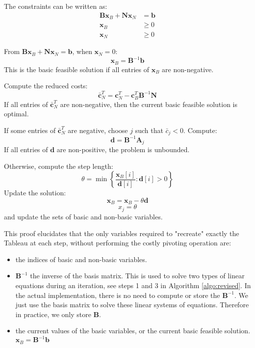 The constraints can be written as:
\begin{align*}
    \mathbf{B}\mathbf{x}_B + \mathbf{N}\mathbf{x}_N & = \mathbf{b} \\
    \mathbf{x}_B                                    & \geq 0       \\
    \mathbf{x}_N                                    & \geq 0
\end{align*}

From \( \mathbf{B}\mathbf{x}_B + \mathbf{N}\mathbf{x}_N = \mathbf{b} \), when \( \mathbf{x}_N = 0 \):
\[ \mathbf{x}_B = \mathbf{B}^{-1}\mathbf{b} \]
This is the basic feasible solution if all entries of \( \mathbf{x}_B \) are non-negative.

Compute the reduced costs:
\[ \bar{\mathbf{c}}_N^T = \mathbf{c}_N^T - \mathbf{c}_B^T \mathbf{B}^{-1} \mathbf{N} \]
If all entries of \( \bar{\mathbf{c}}_N^T \) are non-negative,
then the current basic feasible solution is optimal.

If some entries of \( \bar{\mathbf{c}}_N^T \) are negative,
choose \( j \) such that \( \bar{c}_j < 0 \). Compute:
\[ \mathbf{d} = \mathbf{B}^{-1} \mathbf{A}_j \]
If all entries of \( \mathbf{d} \) are non-positive, the problem is unbounded.

Otherwise, compute the step length:
\[ \theta = \min \left\{ \frac{\mathbf{x}_B[i]}{\mathbf{d}[i]} : \mathbf{d}[i] > 0 \right\} \]
Update the solution:
\[ \mathbf{x}_B = \mathbf{x}_B - \theta \mathbf{d} \]
\[ x_j = \theta \]
and update the sets of basic and non-basic variables.

This proof elucidates that the only variables required to "recreate" exactly the Tableau at
each step, without performing the costly pivoting operation are:
\begin{itemize}
    \item the indices of basic and non-basic variables.
    \item $\mathbf{B}^{-1}$ the inverse of the basis matrix. This is used to solve two types of linear equations
          during an iteration, see steps 1 and 3 in Algorithm \ref{algo:revised}.
          In the actual implementation, there is no need to compute or store the $\mathbf{B}^{-1}$.
          We just use the basis matrix to solve these linear systems of
          equations. Therefore in practice, we only store $\mathbf{B}$.
    \item the current values of the basic variables, or the current basic feasible solution. $\mathbf{x}_B = \mathbf{B}^{-1}\mathbf{b}$
\end{itemize}

